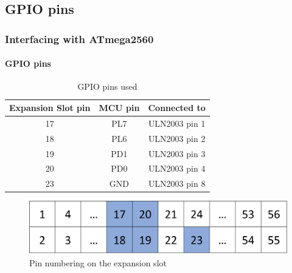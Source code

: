 \documentclass[table,10pt,red]{beamer}	%
\begin{document}
\subsection{GPIO pins}
\begin{frame}
	\frametitle{Interfacing with ATmega2560}
	\framesubtitle{GPIO pins}
	\pause
	\begin{center}
		\begin{table}
			\begin{tabular}{c c c}
			\toprule
			\textbf{Expansion Slot pin} & \textbf{MCU pin} & \textbf{Connected to}\\
			\midrule
			17 & PL7 & ULN2003 pin 1 \\
			18 & PL6 & ULN2003 pin 2 \\
			19 & PD1 & ULN2003 pin 3 \\
			20 & PD0 & ULN2003 pin 4 \\
			23 & GND & ULN2003 pin 8 \\
			\bottomrule
			\end{tabular}
			\caption{GPIO pins used}
		\end{table}
		
		\pause
		\begin{figure}
			\includegraphics[width=0.5\linewidth]{pinnumbering}
			\caption{Pin numbering on the expansion slot}
		\end{figure}
	\end{center}
\end{frame}
\end{document}
